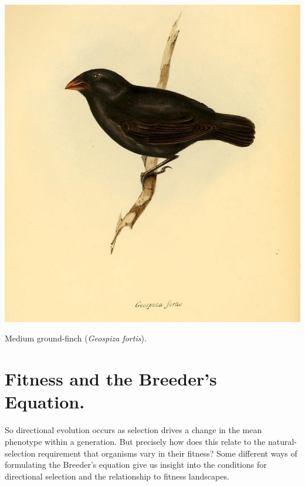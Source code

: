 \begin{marginfigure}
\begin{center}
\includegraphics[width= \textwidth]{illustration_images/Quant_gen/Darwins_Finch/Geospiza_fortis.png}
\end{center}
\caption{Medium ground-finch ({\it Geospiza fortis}). } \label{fig:Geospiza_fortis}  
\end{marginfigure}

\section{Fitness and the Breeder's Equation.}
So directional evolution occurs as selection drives a change in
the mean phenotype within a generation. But precisely how does this relate to
the natural-selection requirement that organisms vary in their
fitness? Some different ways of formulating the Breeder's equation
give us insight into the conditions for directional selection and the
relationship to fitness landscapes.

